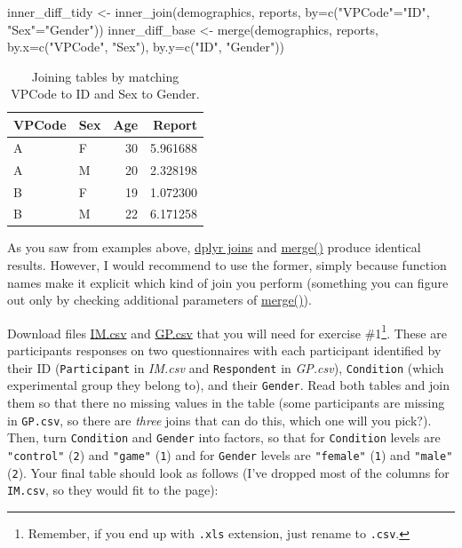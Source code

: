 \documentclass[
]{book}
\newenvironment{Shaded}{\begin{snugshade}}{\end{snugshade}}
\newcommand{\AttributeTok}[1]{\textcolor[rgb]{0.77,0.63,0.00}{#1}}
\newcommand{\FunctionTok}[1]{\textcolor[rgb]{0.00,0.00,0.00}{#1}}
\newcommand{\NormalTok}[1]{#1}
\newcommand{\OtherTok}[1]{\textcolor[rgb]{0.56,0.35,0.01}{#1}}
\newcommand{\StringTok}[1]{\textcolor[rgb]{0.31,0.60,0.02}{#1}}
\begin{document}
\begin{Shaded}
\begin{Highlighting}[]
\NormalTok{inner\_diff\_tidy }\OtherTok{\textless{}{-}} \FunctionTok{inner\_join}\NormalTok{(demographics, reports, }\AttributeTok{by=}\FunctionTok{c}\NormalTok{(}\StringTok{"VPCode"}\OtherTok{=}\StringTok{"ID"}\NormalTok{, }\StringTok{"Sex"}\OtherTok{=}\StringTok{"Gender"}\NormalTok{))}
\NormalTok{inner\_diff\_base }\OtherTok{\textless{}{-}} \FunctionTok{merge}\NormalTok{(demographics, reports, }\AttributeTok{by.x=}\FunctionTok{c}\NormalTok{(}\StringTok{"VPCode"}\NormalTok{, }\StringTok{"Sex"}\NormalTok{), }\AttributeTok{by.y=}\FunctionTok{c}\NormalTok{(}\StringTok{"ID"}\NormalTok{, }\StringTok{"Gender"}\NormalTok{))}
\end{Highlighting}
\end{Shaded}

\begin{table}

\caption{\label{tab:unnamed-chunk-203}Joining tables by matching VPCode to ID and Sex to Gender.}
\centering
\begin{tabular}[t]{l|l|r|r}
\hline
VPCode & Sex & Age & Report\\
\hline
A & F & 30 & 5.961688\\
\hline
A & M & 20 & 2.328198\\
\hline
B & F & 19 & 1.072300\\
\hline
B & M & 22 & 6.171258\\
\hline
\end{tabular}
\end{table}

As you saw from examples above, \href{https://dplyr.tidyverse.org/reference/mutate-joins.html}{dplyr joins} and \href{https://stat.ethz.ch/R-manual/R-devel/library/base/html/merge.html}{merge()} produce identical results. However, I would recommend to use the former, simply because function names make it explicit which kind of join you perform (something you can figure out only by checking additional parameters of \href{https://stat.ethz.ch/R-manual/R-devel/library/base/html/merge.html}{merge()}).

Download files \href{data/IM.csv}{IM.csv} and \href{data/GP.csv}{GP.csv} that you will need for exercise \#1\footnote{Remember, if you end up with \texttt{.xls} extension, just rename to \texttt{.csv}.}. These are participants responses on two questionnaires with each participant identified by their ID (\texttt{Participant} in \emph{IM.csv} and \texttt{Respondent} in \emph{GP.csv}), \texttt{Condition} (which experimental group they belong to), and their \texttt{Gender}. Read both tables and join them so that there no missing values in the table (some participants are missing in \texttt{GP.csv}, so there are \emph{three} joins that can do this, which one will you pick?). Then, turn \texttt{Condition} and \texttt{Gender} into factors, so that for \texttt{Condition} levels are \texttt{"control"} (\texttt{2}) and \texttt{"game"} (\texttt{1}) and for \texttt{Gender} levels are \texttt{"female"} (\texttt{1}) and \texttt{"male"} (\texttt{2}). Your final table should look as follows (I've dropped most of the columns for \texttt{IM.csv}, so they would fit to the page):
\end{document}
